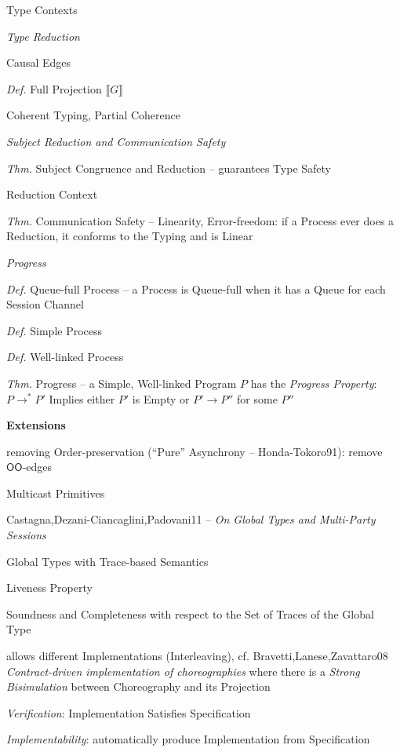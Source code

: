 Type Contexts


\emph{Type Reduction}

Causal Edges %

\emph{Def.} Full Projection $\llbracket G \rrbracket$

Coherent Typing, Partial Coherence


\emph{Subject Reduction and Communication Safety}

\emph{Thm.} Subject Congruence and Reduction -- guarantees Type Safety

Reduction Context

\emph{Thm.} Communication Safety -- Linearity, Error-freedom: if a
Process ever does a Reduction, it conforms to the Typing and is Linear


\emph{Progress}

\emph{Def.} Queue-full Process -- a Process is Queue-full when it has
a Queue for each Session Channel

\emph{Def.} Simple Process

\emph{Def.} Well-linked Process

\emph{Thm.} Progress -- a Simple, Well-linked Program $P$ has the
\emph{Progress Property}: $P \rightarrow^* P'$ Implies either $P'$ is
Empty or $P' \rightarrow P''$ for some $P''$


\textbf{Extensions}

removing Order-preservation (``Pure'' Asynchrony -- Honda-Tokoro91):
remove $\mathsf{OO}$-edges %

Multicast Primitives


\asterism


Castagna,Dezani-Ciancaglini,Padovani11 -- \emph{On Global Types and
  Multi-Party Sessions}

Global Types with Trace-based Semantics

Liveness Property

Soundness and Completeness with respect to the Set of Traces of the
Global Type

allows different Implementations (Interleaving), cf.
Bravetti,Lanese,Zavattaro08 \emph{Contract-driven implementation of
  choreographies} where there is a \emph{Strong Bisimulation} between
Choreography and its Projection

\emph{Verification}: Implementation Satisfies Specification

\emph{Implementability}: automatically produce Implementation from
Specification

